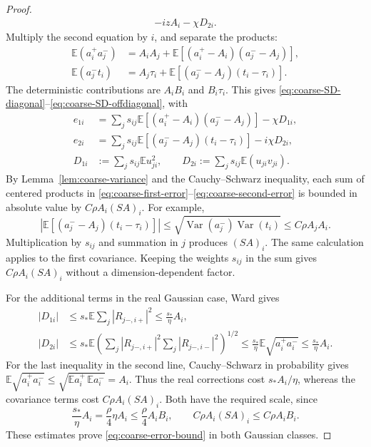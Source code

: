 \documentclass[11pt,reqno]{amsart}
\numberwithin{equation}{section}
\theoremstyle{plain}
\theoremstyle{definition}
\theoremstyle{remark}
\begin{document}
\begin{proof}
\begin{align*}
       -izA_i-\chi D_{2i}.
\end{align*}
Multiply the second equation by $i$, and separate the products:
\begin{align*}
 \mathbb E(a_i^+a_j^-)
 &=A_iA_j+\mathbb E[(a_i^+-A_i)(a_j^--A_j)],\\
 \mathbb E(a_j^-t_i)
 &=A_j\tau_i+\mathbb E[(a_j^--A_j)(t_i-\tau_i)].
\end{align*}
The deterministic contributions are $A_iB_i$ and $B_i\tau_i$.
This gives
\eqref{eq:coarse-SD-diagonal}--\eqref{eq:coarse-SD-offdiagonal}, with
\begin{align}
 e_{1i}
 &=\sum_js_{ij}\mathbb E[(a_i^+-A_i)(a_j^--A_j)]-\chi D_{1i},
 \label{eq:coarse-first-error}\\
 e_{2i}
 &=\sum_js_{ij}\mathbb E[(a_j^--A_j)(t_i-\tau_i)]-i\chi D_{2i},
 \label{eq:coarse-second-error}\\
 D_{1i}&:=\sum_js_{ij}\mathbb E u_{ji}^{2},\qquad
 D_{2i}:=\sum_js_{ij}\mathbb E(u_{ji}v_{ji}).
 \label{eq:coarse-real-corrections}
\end{align}
By Lemma~\ref{lem:coarse-variance} and the Cauchy--Schwarz inequality,
each sum of centered products in \eqref{eq:coarse-first-error}--\eqref{eq:coarse-second-error}
is bounded in absolute value by $C\rho A_i(SA)_i$. For example,
\[
 \left|\mathbb E[(a_j^--A_j)(t_i-\tau_i)]\right|
 \le \sqrt{\operatorname{Var}(a_j^-)\operatorname{Var}(t_i)}
 \le C\rho A_jA_i.
\]
Multiplication by $s_{ij}$ and summation in $j$ produces $(SA)_i$.
The same calculation applies to the first covariance. Keeping the
weights $s_{ij}$ in the sum gives $C\rho A_i(SA)_i$ without a
dimension-dependent factor.

For the additional terms in the real Gaussian case, Ward gives
\begin{align*}
 |D_{1i}|&\le s_*\mathbb E\sum_j|R_{j-,i+}|^2
 \le\frac{s_*}{\eta}A_i,\\
 |D_{2i}|&\le s_*\mathbb E
 \left(\sum_j|R_{j-,i+}|^2\sum_j|R_{j-,i-}|^2\right)^{1/2}
 \le\frac{s_*}{\eta}\mathbb E\sqrt{a_i^+a_i^-}
 \le\frac{s_*}{\eta}A_i.
\end{align*}
For the last inequality in the second line, Cauchy--Schwarz in
probability gives
$\mathbb E\sqrt{a_i^+a_i^-}\le
\sqrt{\mathbb Ea_i^+\,\mathbb Ea_i^-}=A_i$.
Thus the real corrections cost $s_*A_i/\eta$, whereas the covariance
terms cost $C\rho A_i(SA)_i$. Both have the required scale, since
\[
 \frac{s_*}{\eta}A_i=\frac\rho4\eta A_i\le\frac\rho4 A_iB_i,
 \qquad
 C\rho A_i(SA)_i\le C\rho A_iB_i.
\]
These estimates
prove \eqref{eq:coarse-error-bound} in both Gaussian classes.
\end{proof}
\end{document}
